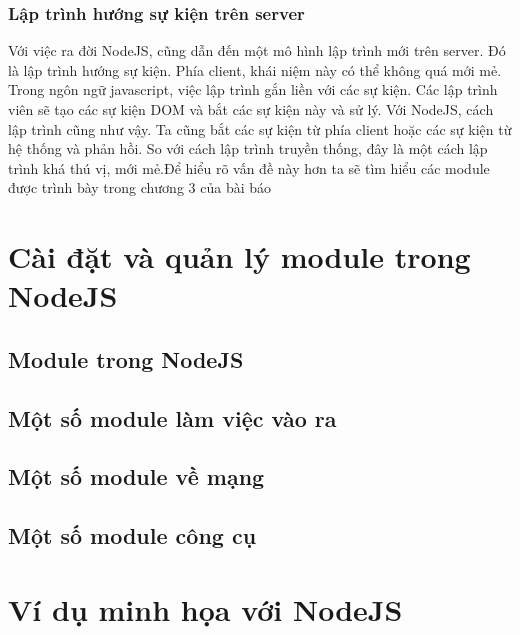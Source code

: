 \documentclass[a4paper,12pt]{report}
\begin{document}
\subsection{Lập trình hướng sự kiện trên server}
	Với việc ra đời NodeJS, cũng dẫn đến một mô hình lập trình mới trên server. Đó là lập trình hướng sự kiện. Phía client, khái niệm này có thể không quá mới mẻ. Trong ngôn ngữ javascript, việc lập trình gắn liền với các sự kiện. Các lập trình viên sẽ tạo các sự kiện DOM và bắt các sự kiện này và sử lý. Với NodeJS, cách lập trình cũng như vậy. Ta cũng bắt các sự kiện từ phía client hoặc các sự kiện từ hệ thống và phản hồi. So với cách lập trình truyền thống, đây là một cách lập trình khá thú vị, mới mẻ.Để hiểu rõ vấn đề này hơn ta sẽ tìm hiểu các module được trình bày trong chương 3 của bài báo
\chapter{Cài đặt và quản lý module trong NodeJS}

\section{Module trong NodeJS}
\section{Một số module làm việc vào ra}
\section{Một số module về mạng}
\section{Một số module công cụ}

\chapter{Ví dụ minh họa với NodeJS}





\end{document}
